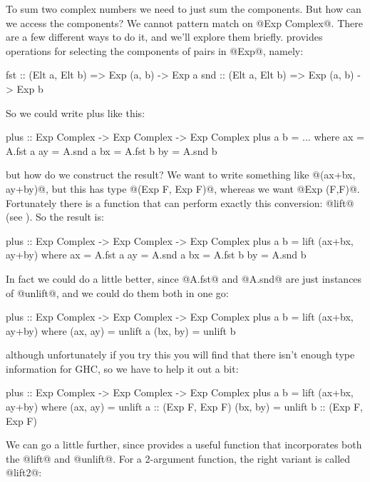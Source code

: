 \noindent To sum two complex numbers we need to just sum the components.  But
how can we access the components?  We cannot pattern match on
@Exp Complex@.  There are a few different ways to do it, and we'll
explore them briefly.  \acc{} provides operations for selecting the
components of pairs in @Exp@, namely:

\begin{haskell}
fst :: (Elt a, Elt b) => Exp (a, b) -> Exp a
snd :: (Elt a, Elt b) => Exp (a, b) -> Exp b
\end{haskell}

\noindent So we could write plus like this:

\begin{haskell}
plus :: Exp Complex -> Exp Complex -> Exp Complex
plus a b = ...
  where
    ax = A.fst a
    ay = A.snd a
    bx = A.fst b
    by = A.snd b
\end{haskell}

\noindent but how do we construct the result?  We want to write
something like @(ax+bx, ay+by)@, but this has type @(Exp F, Exp F)@,
whereas we want @Exp (F,F)@.  Fortunately there is a function that can
perform exactly this conversion: @lift@ (see
).  So the result is:

\begin{haskell}
plus :: Exp Complex -> Exp Complex -> Exp Complex
plus a b = lift (ax+bx, ay+by)
  where
    ax = A.fst a
    ay = A.snd a
    bx = A.fst b
    by = A.snd b
\end{haskell}

In fact we could do a little better, since @A.fst@ and @A.snd@ are
just instances of @unlift@, and we could do them both in one go:

\begin{haskell}
plus :: Exp Complex -> Exp Complex -> Exp Complex
plus a b = lift (ax+bx, ay+by)
  where
    (ax, ay) = unlift a
    (bx, by) = unlift b
\end{haskell}

\noindent although unfortunately if you try this you will find that
there isn't enough type information for GHC, so we have to help it out
a bit:

\begin{haskell}
plus :: Exp Complex -> Exp Complex -> Exp Complex
plus a b = lift (ax+bx, ay+by)
  where
    (ax, ay) = unlift a :: (Exp F, Exp F)
    (bx, by) = unlift b :: (Exp F, Exp F)
\end{haskell}

\noindent We can go a little further, since \acc{} provides a useful
function that incorporates both the @lift@ and @unlift@.  For a
2-argument function, the right variant is called @lift2@:

